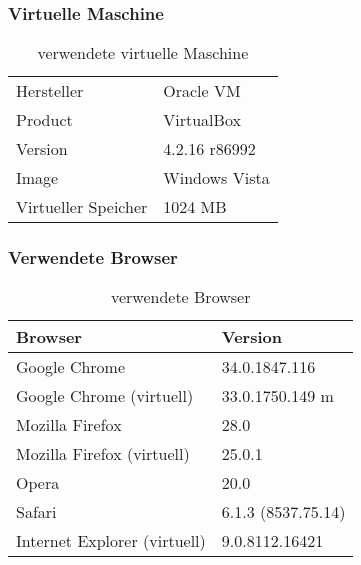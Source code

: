 	\subsubsection{Virtuelle Maschine}
	\begin{table}[H]
	 \vspace{-20pt}
 		\centering
			\begin{tabular}{| p{4cm} | p{8cm}  |}
			\hline
				Hersteller			&	Oracle VM\\
				Product			&	VirtualBox\\
				Version			&	4.2.16 r86992\\
				Image			&	Windows Vista\\
				Virtueller Speicher	&	1024 MB\\
				\hline
				\end{tabular}
			\caption{verwendete virtuelle Maschine}
	\end{table}
	
	\subsubsection{Verwendete Browser}	
	\begin{table}[H]
	 \vspace{-20pt}
 		\centering
			\begin{tabular}{| p{8cm} | p{4cm}  |}
			\hline
				Browser		 	&	Version	\\
			\hline

			\hline
				Google Chrome			&	34.0.1847.116\\
				Google Chrome (virtuell)		&	33.0.1750.149 m\\
				Mozilla Firefox				&	28.0\\
				Mozilla Firefox (virtuell)		&	25.0.1\\
				Opera					&	20.0\\
				Safari					&	6.1.3 (8537.75.14)\\
				Internet Explorer (virtuell)		&	9.0.8112.16421\\
				\hline
				\end{tabular}
			\caption{verwendete Browser}
	\end{table}


	
	
	
